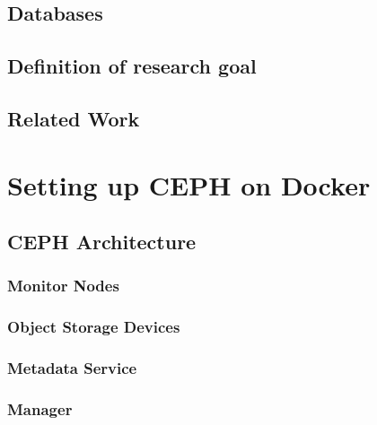 \documentclass[titlepage, a4paper, 11pt]{scrartcl}
\begin{document}

        \subsection{Databases}


        \subsection{Definition of research goal}        


        \subsection{Related Work}

    \section{Setting up CEPH on Docker}

        \subsection{CEPH Architecture}
            
            \subsubsection{Monitor Nodes}


            \subsubsection{Object Storage Devices}


            \subsubsection{Metadata Service}

            \subsubsection{Manager}    
\end{document}
